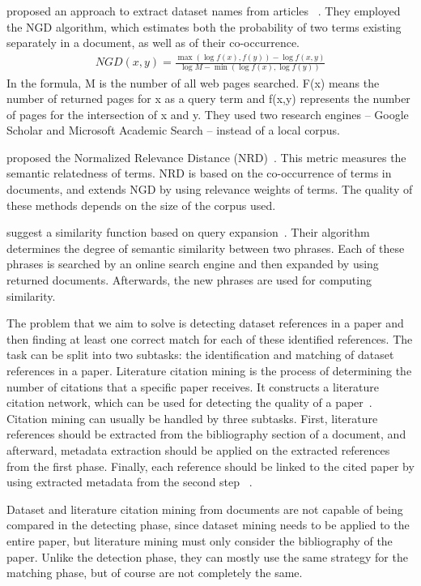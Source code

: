 \documentclass{IOS-Book-Article}
\begin{document}
\citeauthor{sighal2013} proposed an approach to extract dataset names from articles ~\citeyearpar{sighal2013}. They employed the NGD algorithm, which estimates both the probability of two terms existing separately in a document, as well as of their co-occurrence. 
\begin{align*}
	NGD(x,y)=\frac{\max(\log f(x),f(y))-\log f(x,y)}{\log M -\min(\log f(x),\log f(y))}
\end{align*}
In the formula, M is the number of all web pages searched. F(x) means the number of returned pages for x as a query term and f(x,y) represents the number of pages for the intersection of x and y. 
They used two research engines -- Google Scholar and Microsoft Academic Search -- instead of a local corpus.

\citeauthor{Schaefer2014} proposed the Normalized Relevance Distance (NRD)~\citeyearpar{Schaefer2014}. This metric measures the semantic relatedness of terms. NRD is based on the co-occurrence of terms in documents, and extends NGD by using relevance weights of terms. The quality of these methods depends on the size of the corpus used.

\citeauthor{Sahami2006} suggest a similarity function based on query expansion~\citeyearpar{Sahami2006}. Their algorithm determines the degree of semantic similarity between two phrases. Each of these phrases is searched by an online search engine and then expanded by using returned documents. Afterwards, the new phrases are used for computing similarity. 

The problem that we aim to solve is detecting dataset references in a paper and then finding at least one correct match for each of these identified references. The task can be split into two subtasks: the identification and matching of dataset references in a paper. Literature citation mining is the process of determining the number of citations that a specific paper receives. It constructs a literature citation network, which can be used for detecting the quality of a paper~\cite{Afzal2010}. Citation mining can usually be handled by three subtasks. First, literature references should be extracted from the bibliography section of a document, and afterward, metadata extraction should be applied on the extracted references from the first phase. Finally, each reference should be linked to the cited paper by using extracted metadata from the second step ~\cite{Afzal2010}.

Dataset and literature citation mining from documents are not capable of being compared in the detecting phase, since dataset mining needs to be applied to the entire paper, but literature mining must only consider the bibliography of the paper. Unlike the detection phase, they can mostly use the same strategy for the matching phase, but of course are not completely the same. 
\end{document}
